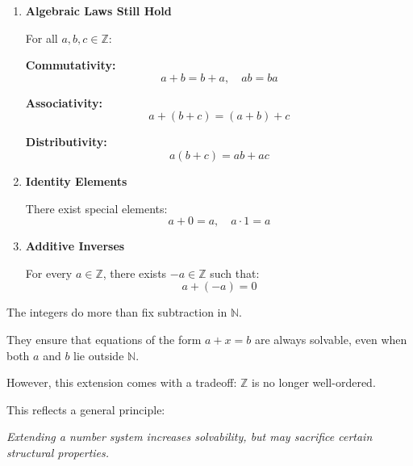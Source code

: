 \documentclass[11pt]{article}
\newcommand{\N}{\mathbb{N}}
\newcommand{\Z}{\mathbb{Z}}
\begin{document}
\begin{theorybox}
\begin{enumerate}
\item \textbf{Algebraic Laws Still Hold}

For all $a,b,c \in \Z$:

\textbf{Commutativity:}
\[
a+b = b+a, \quad ab = ba
\]

\textbf{Associativity:}
\[
a+(b+c) = (a+b)+c
\]

\textbf{Distributivity:}
\[
a(b+c) = ab + ac
\]

\item \textbf{Identity Elements}

There exist special elements:
\[
a + 0 = a, \quad a \cdot 1 = a
\]

\item \textbf{Additive Inverses}

For every $a \in \Z$, there exists $-a \in \Z$ such that:
\[
a + (-a) = 0
\]

\end{enumerate}

\end{theorybox}

\begin{center}
\end{center}

\begin{remarkbox}

The integers do more than fix subtraction in $\N$.

They ensure that equations of the form $a + x = b$ are always solvable, 
even when both $a$ and $b$ lie outside $\N$.

However, this extension comes with a tradeoff:  
$\Z$ is no longer well-ordered.

This reflects a general principle:

\textit{Extending a number system increases solvability, 
but may sacrifice certain structural properties.}

\end{remarkbox}
\end{document}
